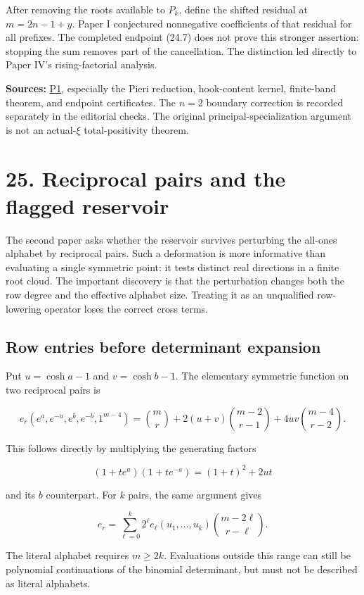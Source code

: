 \documentclass[
  10pt,
  a4paper,
  10pt,
  oneside,
  openany]{book}
\begin{document}
After removing the roots available to \(P_k\), define the shifted
residual at \(m=2n-1+y\). Paper I conjectured nonnegative coefficients
of that residual for all prefixes. The completed endpoint (24.7) does
not prove this stronger assertion: stopping the sum removes part of the
cancellation. The distinction led directly to Paper IV's
rising-factorial analysis.

\textbf{Sources:} \hyperref[source-p1]{P1}, especially the Pieri
reduction, hook-content kernel, finite-band theorem, and endpoint
certificates. The \(n=2\) boundary correction is recorded separately in
the editorial checks. The original principal-specialization argument is
not an actual-\(\xi\) total-positivity theorem.

\section{25. Reciprocal pairs and the flagged
reservoir}\label{ch-reciprocal}

The second paper asks whether the reservoir survives perturbing the
all-ones alphabet by reciprocal pairs. Such a deformation is more
informative than evaluating a single symmetric point: it tests distinct
real directions in a finite root cloud. The important discovery is that
the perturbation changes both the row degree and the effective alphabet
size. Treating it as an unqualified row-lowering operator loses the
correct cross terms.

\subsection{Row entries before determinant
expansion}\label{row-entries-before-determinant-expansion}

Put \(u=\cosh a-1\) and \(v=\cosh b-1\). The elementary symmetric
function on two reciprocal pairs is

\[
 e_r(e^a,e^{-a},e^b,e^{-b},1^{m-4})
 =\binom mr+2(u+v)\binom{m-2}{r-1}
 +4uv\binom{m-4}{r-2}.
 \tag{25.1}\label{eq:25.1}
\]

This follows directly by multiplying the generating factors

\[
 (1+te^a)(1+te^{-a})=(1+t)^2+2ut
\]

and its \(b\) counterpart. For \(k\) pairs, the same argument gives

\[
 e_r=\sum_{\ell=0}^k2^\ell e_\ell(u_1,\ldots,u_k)
 \binom{m-2\ell}{r-\ell}.
 \tag{25.2}\label{eq:25.2}
\]

The literal alphabet requires \(m\ge2k\). Evaluations outside this range
can still be polynomial continuations of the binomial determinant, but
must not be described as literal alphabets.
\end{document}
